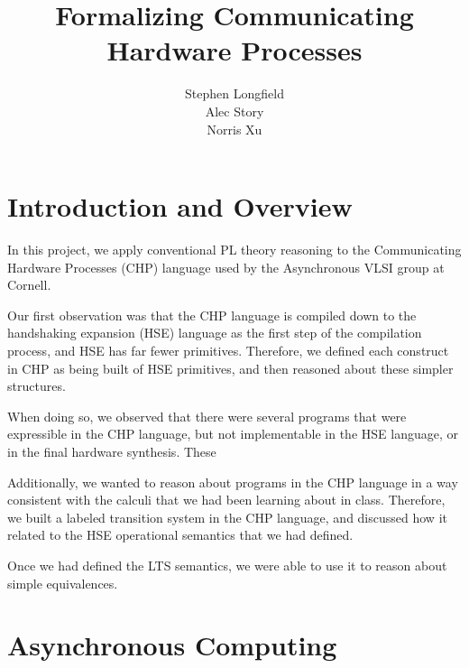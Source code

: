 \documentclass[times, 10pt]{article}
\begin{document}
\title{Formalizing Communicating Hardware Processes}
\author{Stephen Longfield\\Alec Story\\Norris Xu}
\maketitle

\section{Introduction and Overview}

In this project, we apply conventional PL theory reasoning to the Communicating
Hardware Processes (CHP) language used by the Asynchronous VLSI group at
Cornell. 

Our first observation was that the CHP language is compiled down to the
handshaking expansion (HSE) language as the first step of the compilation
process, and HSE has far fewer primitives.  Therefore, we defined each construct
in CHP as being built of HSE primitives, and then reasoned about these simpler
structures.

When doing so, we observed that there were several programs that were
expressible in the CHP language, but not implementable in the HSE language, or
in the final hardware synthesis.  These 

Additionally, we wanted to reason about programs in the CHP language in a way
consistent with the calculi that we had been learning about in class.
Therefore, we built a labeled transition system in the CHP language, and
discussed how it related to the HSE operational semantics that we had defined.

Once we had defined the LTS semantics, we were able to use it to reason about
simple equivalences.

\section{Asynchronous Computing}
\end{document}
